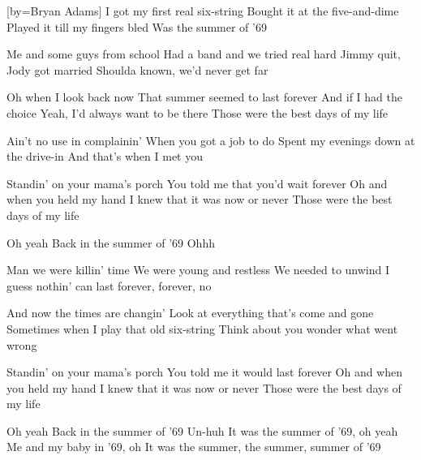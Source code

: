 [by={Bryan Adams}]
\beginverse
I got my first real six-string
Bought it at the five-and-dime
Played it till my fingers bled
Was the summer of '69
\endverse

\beginverse
Me and some guys from school
Had a band and we tried real hard
Jimmy quit, Jody got married
Shoulda known, we'd never get far
\endverse 

\beginverse 
Oh when I look back now
That summer seemed to last forever
And if I had the choice
Yeah, I'd always want to be there
Those were the best days of my life
\endverse

\beginverse 
Ain't no use in complainin'
When you got a job to do
Spent my evenings down at the drive-in
And that's when I met you
\endverse

\beginverse
Standin' on your mama's porch
You told me that you'd wait forever
Oh and when you held my hand
I knew that it was now or never
Those were the best days of my life
\endverse

\beginchorus
Oh yeah
Back in the summer of '69
Ohhh
\endchorus

\beginverse
Man we were killin' time
We were young and restless
We needed to unwind
I guess nothin' can last forever, forever, no
\endverse

\beginverse
And now the times are changin'
Look at everything that's come and gone
Sometimes when I play that old six-string
Think about you wonder what went wrong
\endverse 

\beginverse 
Standin' on your mama's porch
You told me it would last forever
Oh and when you held my hand
I knew that it was now or never
Those were the best days of my life
\endverse

\beginchorus
Oh yeah
Back in the summer of '69
Un-huh
It was the summer of '69, oh yeah
Me and my baby in '69, oh
It was the summer, the summer, summer of '69
\endchorus
\endsong